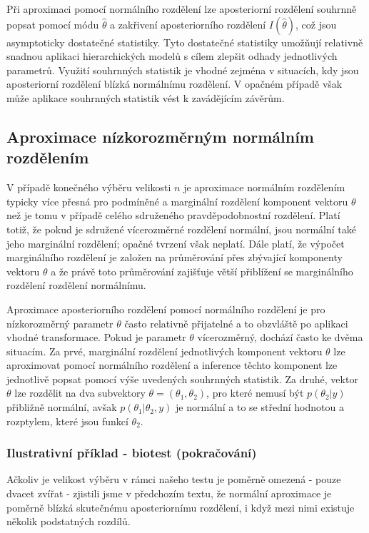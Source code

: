 Při aproximaci pomocí normálního rozdělení lze aposteriorní rozdělení souhrnně popsat pomocí módu $\hat{\theta}$ a zakřivení aposteriorního rozdělení $I(\hat{\theta})$, což jsou asymptoticky dostatečné statistiky. Tyto dostatečné statistiky umožňují relativně snadnou aplikaci hierarchických modelů s cílem zlepšit odhady jednotlivých parametrů. Využití souhrnných statistik je vhodné zejména v situacích, kdy jsou aposteriorní rozdělení blízká normálnímu rozdělení. V opačném případě však může aplikace souhrnných statistik vést k zavádějícím závěrům.

\subsection{Aproximace nízkorozměrným normálním rozdělením}

V případě konečného výběru velikosti $n$ je aproximace normálním rozdělením typicky více přesná pro podmíněné a marginální rozdělení komponent vektoru $\theta$ než je tomu v případě celého sdruženého pravděpodobnostní rozdělení. Platí totiž, že pokud je sdružené vícerozměrné rozdělení normální, jsou normální také jeho marginální rozdělení; opačné tvrzení však neplatí. Dále platí, že výpočet marginálního rozdělení je založen na průměrování přes zbývající komponenty vektoru $\theta$ a že právě toto průměrování zajišťuje větší přiblížení se marginálního rozdělení rozdělení normálnímu.

Aproximace aposteriorního rozdělení pomocí normálního rozdělení je pro nízkorozměrný parametr $\theta$ často relativně přijatelné a to obzvláště po aplikaci vhodné transformace. Pokud je parametr $\theta$ vícerozměrný, dochází často ke dvěma situacím. Za prvé, marginální rozdělení jednotlivých komponent vektoru $\theta$ lze aproximovat pomocí normálního rozdělení a inference těchto komponent lze jednotlivě popsat pomocí výše uvedených souhrnných statistik. Za druhé, vektor $\theta$ lze rozdělit na dva subvektory $\theta = (\theta_1, \theta_2)$, pro které nemusí být $p(\theta_2|y)$ přibližně normální, avšak $p(\theta_1 | \theta_2, y)$ je normální a to se střední hodnotou a rozptylem, které jsou funkcí $\theta_2$.

\subsubsection{Ilustrativní příklad - biotest (pokračování)}

Ačkoliv je velikost výběru v rámci našeho testu je poměrně omezená - pouze dvacet zvířat - zjistili jsme v předchozím textu, že normální aproximace je poměrně blízká skutečnému aposteriornímu rozdělení, i když mezi nimi existuje několik podstatných rozdílů.


